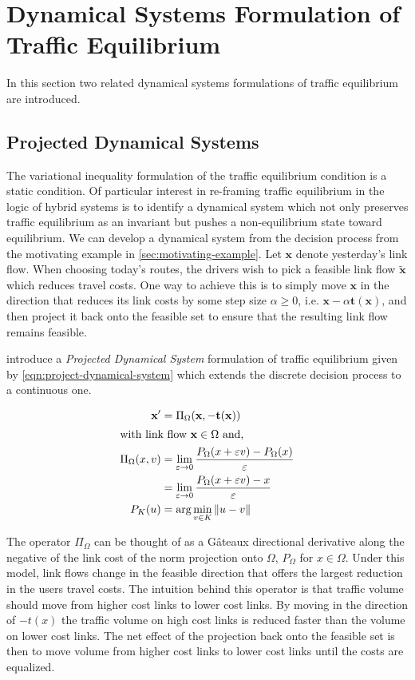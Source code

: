 \section{Dynamical Systems Formulation of Traffic Equilibrium}\label{sec:equilibrium-dynamics}

In this section two related dynamical systems formulations of traffic equilibrium are introduced.

\subsection{Projected Dynamical Systems}

The variational inequality formulation of the traffic equilibrium condition is a static condition.
Of particular interest in re-framing traffic equilibrium in the logic of hybrid systems is to identify a dynamical system which not only preserves traffic equilibrium as an invariant but pushes a non-equilibrium state toward equilibrium.
We can develop a dynamical system from the decision process from the motivating example in \cref{sec:motivating-example}.
Let $\mathbf{x}$ denote yesterday's link flow.
When choosing today's routes, the drivers wish to pick a feasible link flow $\mathbf{\tilde{x}}$ which reduces travel costs.
One way to achieve this is to simply move $\mathbf{x}$ in the direction that reduces its link costs by some step size $\alpha \geq 0$, i.e. $\mathbf{x}-\alpha \mathbf{t}(\mathbf{x})$, and then project it back onto the feasible set to ensure that the resulting link flow remains feasible.

\citet{nagurney1997projected} introduce a \textit{Projected Dynamical System} formulation of traffic equilibrium given by \eqref{eqn:project-dynamical-system} which extends the discrete decision process to a continuous one.

\begin{align}
    \mathbf{x}' &= \Pi_{\Omega}(\mathbf{x}, -\mathbf{t}(\mathbf{x}))\label{eqn:project-dynamical-system}\\
    \intertext{with link flow $\mathbf{x} \in \Omega$ and,}
    \Pi_{\Omega}(x, v) &= \lim_{\varepsilon\to 0}\frac{P_{\Omega}(x + \varepsilon v) - P_{\Omega}(x)}{\varepsilon}\\
        &= \lim_{\varepsilon\to 0}\frac{P_{\Omega}(x + \varepsilon v) - x}{\varepsilon}\\
    P_{K}(u) &= \arg\min_{v\in K} \| u-v\|
\end{align}

The operator $\Pi_{\Omega}$ can be thought of as a G\^{a}teaux directional derivative along the negative of the link cost of the norm projection onto $\Omega$, $P_{\Omega}$ for $x\in \Omega$.
Under this model, link flows change in the feasible direction that offers the largest reduction in the users travel costs.
The intuition behind this operator is that traffic volume should move from higher cost links to lower cost links.
By moving in the direction of $-t(x)$ the traffic volume on high cost links is reduced faster than the volume on lower cost links.
The net effect of the projection back onto the feasible set is then to move volume from higher cost links to lower cost links until the costs are equalized.

